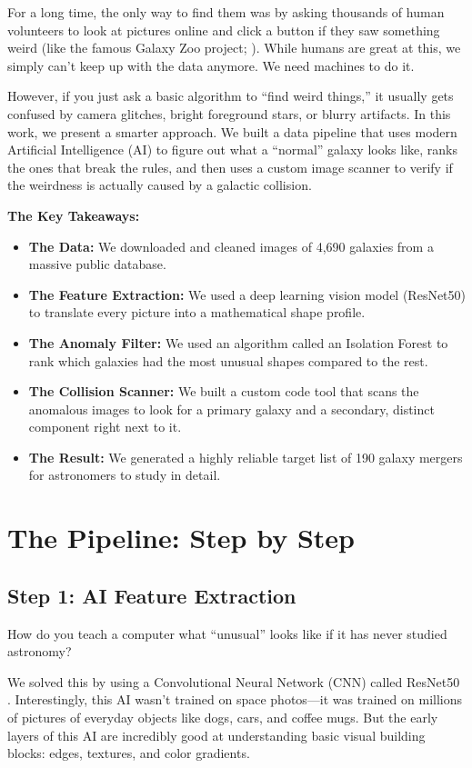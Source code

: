 \documentclass[twocolumn]{aastex631}
\begin{document}
For a long time, the only way to find them was by asking thousands of human volunteers to look at pictures online and click a button if they saw something weird (like the famous Galaxy Zoo project; \citealp{lintott2008}). While humans are great at this, we simply can't keep up with the data anymore. We need machines to do it.

However, if you just ask a basic algorithm to ``find weird things,'' it usually gets confused by camera glitches, bright foreground stars, or blurry artifacts. In this work, we present a smarter approach. We built a data pipeline that uses modern Artificial Intelligence (AI) to figure out what a ``normal'' galaxy looks like, ranks the ones that break the rules, and then uses a custom image scanner to verify if the weirdness is actually caused by a galactic collision.

\textbf{The Key Takeaways:}
\begin{itemize}
    \item \textbf{The Data:} We downloaded and cleaned images of 4,690 galaxies from a massive public database.
    \item \textbf{The Feature Extraction:} We used a deep learning vision model (ResNet50) to translate every picture into a mathematical shape profile.
    \item \textbf{The Anomaly Filter:} We used an algorithm called an Isolation Forest to rank which galaxies had the most unusual shapes compared to the rest.
    \item \textbf{The Collision Scanner:} We built a custom code tool that scans the anomalous images to look for a primary galaxy and a secondary, distinct component right next to it.
    \item \textbf{The Result:} We generated a highly reliable target list of 190 galaxy mergers for astronomers to study in detail.
\end{itemize}

\section{The Pipeline: Step by Step} \label{sec:methods}

\subsection{Step 1: AI Feature Extraction}
How do you teach a computer what ``unusual'' looks like if it has never studied astronomy? 

We solved this by using a Convolutional Neural Network (CNN) called ResNet50 \citep{he2016}. Interestingly, this AI wasn't trained on space photos—it was trained on millions of pictures of everyday objects like dogs, cars, and coffee mugs. But the early layers of this AI are incredibly good at understanding basic visual building blocks: edges, textures, and color gradients. 
\end{document}
